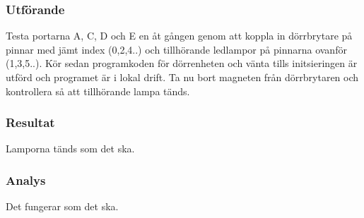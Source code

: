 \subsubsection*{Utförande}
Testa portarna A, C, D och E  en åt gången genom att koppla in dörrbrytare på pinnar med jämt index (0,2,4..) och tillhörande ledlampor på pinnarna ovanför (1,3,5..). Kör sedan programkoden för dörrenheten och vänta tills initsieringen är utförd och programet är i lokal drift. Ta nu bort magneten från dörrbrytaren och kontrollera så att tillhörande lampa tänds.


\subsubsection*{Resultat}
Lamporna tänds som det ska.



\subsubsection*{Analys}
Det fungerar som det ska.


